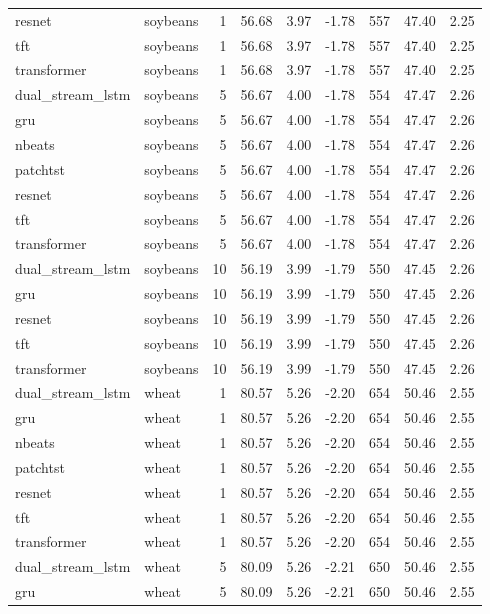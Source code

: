 \begin{tabular}{llrrrrrrr}
resnet & soybeans & 1 & 56.68 & 3.97 & -1.78 & 557 & 47.40 & 2.25 \\
tft & soybeans & 1 & 56.68 & 3.97 & -1.78 & 557 & 47.40 & 2.25 \\
transformer & soybeans & 1 & 56.68 & 3.97 & -1.78 & 557 & 47.40 & 2.25 \\
dual_stream_lstm & soybeans & 5 & 56.67 & 4.00 & -1.78 & 554 & 47.47 & 2.26 \\
gru & soybeans & 5 & 56.67 & 4.00 & -1.78 & 554 & 47.47 & 2.26 \\
nbeats & soybeans & 5 & 56.67 & 4.00 & -1.78 & 554 & 47.47 & 2.26 \\
patchtst & soybeans & 5 & 56.67 & 4.00 & -1.78 & 554 & 47.47 & 2.26 \\
resnet & soybeans & 5 & 56.67 & 4.00 & -1.78 & 554 & 47.47 & 2.26 \\
tft & soybeans & 5 & 56.67 & 4.00 & -1.78 & 554 & 47.47 & 2.26 \\
transformer & soybeans & 5 & 56.67 & 4.00 & -1.78 & 554 & 47.47 & 2.26 \\
dual_stream_lstm & soybeans & 10 & 56.19 & 3.99 & -1.79 & 550 & 47.45 & 2.26 \\
gru & soybeans & 10 & 56.19 & 3.99 & -1.79 & 550 & 47.45 & 2.26 \\
resnet & soybeans & 10 & 56.19 & 3.99 & -1.79 & 550 & 47.45 & 2.26 \\
tft & soybeans & 10 & 56.19 & 3.99 & -1.79 & 550 & 47.45 & 2.26 \\
transformer & soybeans & 10 & 56.19 & 3.99 & -1.79 & 550 & 47.45 & 2.26 \\
dual_stream_lstm & wheat & 1 & 80.57 & 5.26 & -2.20 & 654 & 50.46 & 2.55 \\
gru & wheat & 1 & 80.57 & 5.26 & -2.20 & 654 & 50.46 & 2.55 \\
nbeats & wheat & 1 & 80.57 & 5.26 & -2.20 & 654 & 50.46 & 2.55 \\
patchtst & wheat & 1 & 80.57 & 5.26 & -2.20 & 654 & 50.46 & 2.55 \\
resnet & wheat & 1 & 80.57 & 5.26 & -2.20 & 654 & 50.46 & 2.55 \\
tft & wheat & 1 & 80.57 & 5.26 & -2.20 & 654 & 50.46 & 2.55 \\
transformer & wheat & 1 & 80.57 & 5.26 & -2.20 & 654 & 50.46 & 2.55 \\
dual_stream_lstm & wheat & 5 & 80.09 & 5.26 & -2.21 & 650 & 50.46 & 2.55 \\
gru & wheat & 5 & 80.09 & 5.26 & -2.21 & 650 & 50.46 & 2.55 \\

\end{tabular}
